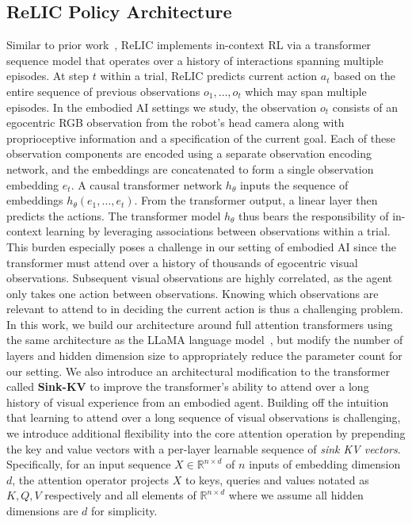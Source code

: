 \documentclass{article}
\newcommand{\method}{ReLIC\xspace}
\newcommand{\sinkv}{Sink-KV\xspace}
\begin{document}
\subsection{\method Policy Architecture}
\label{sec:architecture}
Similar to prior work~\citep{grigsby2023amago,team2023human}, \method implements in-context RL via a transformer sequence model that operates over a history of interactions spanning multiple episodes.
At step $ t$ within a trial, \method predicts current action $ a_t$ based on the entire sequence of previous observations $ o_1, \dots , o_t$ which may span multiple episodes.
In the embodied AI settings we study, the observation $ o_t $ consists of an egocentric RGB observation from the robot's head camera along with proprioceptive information and a specification of the current goal.
Each of these observation components are encoded using a separate observation encoding network, and the embeddings are concatenated to form a single observation embedding $ e_t$.
A causal transformer network \citep{vaswani2023attention} $ h_\theta$ inputs the sequence of embeddings $ h_\theta(e_1, \dots, e_t)$.
From the transformer output, a linear layer then predicts the actions.
The transformer model $ h_\theta$ thus bears the responsibility of in-context learning by leveraging associations between observations within a trial.
This burden especially poses a challenge in our setting of embodied AI since the transformer must attend over a history of thousands of egocentric visual observations.
Subsequent visual observations are highly correlated, as the agent only takes one action between observations.
Knowing which observations are relevant to attend to in deciding the current action is thus a challenging problem.
In this work, we build our architecture around full attention transformers using the same architecture as the LLaMA language model~\citep{touvron2023llamaoa}, but modify the number of layers and hidden dimension size to appropriately reduce the parameter count for our setting.
We also introduce an architectural modification to the transformer called \textbf{\sinkv} to improve the transformer's ability to attend over a long history of visual experience from an embodied agent.
Building off the intuition that learning to attend over a long sequence of visual observations is challenging, we introduce additional flexibility into the core attention operation by prepending the key and value vectors with a per-layer learnable sequence of \emph{sink KV vectors}.
Specifically, for an input sequence $ X \in \mathbb{R}^{n \times d}$ of $ n$ inputs of embedding dimension $ d$, the attention operator projects $ X$ to keys, queries and values notated as $ K, Q, V$ respectively and all elements of $ \mathbb{R}^{n \times d}$ where we assume all hidden dimensions are $d$ for simplicity.
\end{document}
